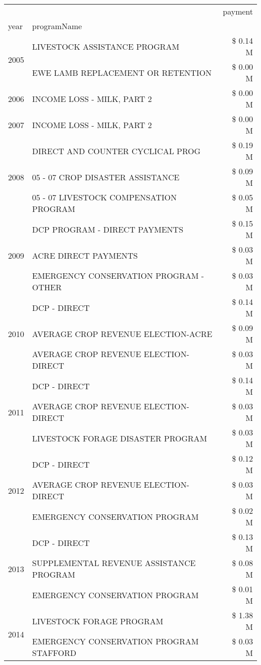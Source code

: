 \begin{tabular}{llr}
\toprule
 &  & payment \\
year & programName &  \\
\midrule
\multirow[t]{2}{*}{2005} & LIVESTOCK ASSISTANCE PROGRAM & \$ 0.14 M \\
 & EWE LAMB REPLACEMENT OR RETENTION & \$ 0.00 M \\
\cline{1-3}
2006 & INCOME LOSS - MILK, PART 2 & \$ 0.00 M \\
\cline{1-3}
2007 & INCOME LOSS - MILK, PART 2 & \$ 0.00 M \\
\cline{1-3}
\multirow[t]{3}{*}{2008} & DIRECT AND COUNTER CYCLICAL PROG & \$ 0.19 M \\
 & 05 - 07 CROP DISASTER ASSISTANCE & \$ 0.09 M \\
 & 05 - 07 LIVESTOCK COMPENSATION PROGRAM & \$ 0.05 M \\
\cline{1-3}
\multirow[t]{3}{*}{2009} & DCP PROGRAM - DIRECT PAYMENTS & \$ 0.15 M \\
 & ACRE DIRECT PAYMENTS & \$ 0.03 M \\
 & EMERGENCY CONSERVATION PROGRAM - OTHER & \$ 0.03 M \\
\cline{1-3}
\multirow[t]{3}{*}{2010} & DCP - DIRECT & \$ 0.14 M \\
 & AVERAGE CROP REVENUE ELECTION-ACRE & \$ 0.09 M \\
 & AVERAGE CROP REVENUE ELECTION-DIRECT & \$ 0.03 M \\
\cline{1-3}
\multirow[t]{3}{*}{2011} & DCP - DIRECT & \$ 0.14 M \\
 & AVERAGE CROP REVENUE ELECTION-DIRECT & \$ 0.03 M \\
 & LIVESTOCK FORAGE DISASTER PROGRAM & \$ 0.03 M \\
\cline{1-3}
\multirow[t]{3}{*}{2012} & DCP - DIRECT & \$ 0.12 M \\
 & AVERAGE CROP REVENUE ELECTION-DIRECT & \$ 0.03 M \\
 & EMERGENCY CONSERVATION PROGRAM & \$ 0.02 M \\
\cline{1-3}
\multirow[t]{3}{*}{2013} & DCP - DIRECT & \$ 0.13 M \\
 & SUPPLEMENTAL REVENUE ASSISTANCE PROGRAM & \$ 0.08 M \\
 & EMERGENCY CONSERVATION PROGRAM & \$ 0.01 M \\
\cline{1-3}
\multirow[t]{3}{*}{2014} & LIVESTOCK FORAGE PROGRAM & \$ 1.38 M \\
 & EMERGENCY CONSERVATION PROGRAM STAFFORD & \$ 0.03 M \\

\end{tabular}
